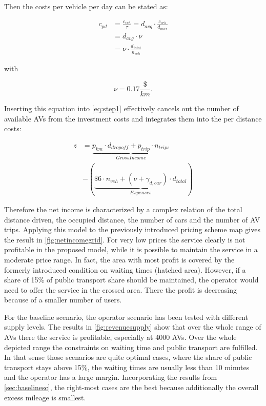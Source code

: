 Then the costs per vehicle per day can be stated as:

\begin{equation}\begin{aligned}
c_{pd} &= \frac{c_{veh}}{\tau} = d_{avg} \cdot \frac{c_{veh}}{d_{max}} \\
&= d_{avg} \cdot \nu\\
&= \nu \cdot \frac{d_{total}}{n_{veh}}
\end{aligned}\end{equation}

with

\begin{equation}
\nu = 0.17 \frac{\$}{km}.
\end{equation}

Inserting this equation into \cref{eq:step1} effectively cancels out the number
of available AVs from the investment costs and integrates them into the per
distance costs:

\begin{equation}\begin{aligned}
z
&= \underbrace{p_{km} \cdot d_{dropoff} + p_{trip} \cdot n_{trips}}_{Gross Income}\\
&- \left( \underbrace{\$6 \cdot n_{veh} + (\nu + \gamma_{d,car}) \cdot d_{total}}_{Expenses} \right)
\label{eq:step1}
\end{aligned}\end{equation}

Therefore the net income is characterized by a complex relation of the total distance
driven, the occupied distance, the number of cars and the number of AV trips. Applying
this model to the previously introduced pricing scheme map gives the result in
\cref{fig:netincomegrid}. For very low prices the service clearly is not profitable
in the proposed model, while it is possible to maintain the service in a moderate
price range. In fact, the area with most profit is covered by the formerly introduced
condition on waiting times (hatched area). However, if a share of 15\% of public
transport share should be maintained, the operator would need to offer the service
in the crossed area. There the profit is decreasing because of a smaller
number of users.

For the baseline scenario, the operator scenario has been tested with different
supply levels. The results in \cref{fig:revenuesupply} show that over the whole
range of AVs there the service is profitable, especially at 4000 AVs. Over the whole
depicted range the constraints on waiting time and public transport are fulfilled.
In that sense those scenarios are quite optimal cases, where the share of
public transport stays above 15\%, the waiting times are usually less than 10
minutes and the operator has a large margin. Incorporating the results from
\cref{sec:baselinesc}, the right-most cases are the best because additionally
the overall excess mileage is smallest.

